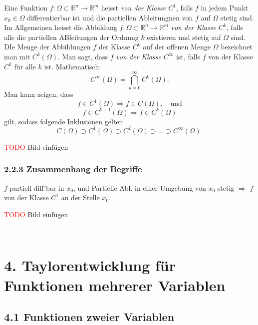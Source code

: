 \documentclass[a4paper,landscape,8pt]{extarticle}
\newcommand{\R}{\mathbb{R}}
\newcommand{\todo}{\textcolor{red}{TODO }}
\renewcommand*{\newpage}{ \ }
\begin{document}
\begin{multicols*}{4}
Eine Funktion $f\colon\Omega\subset\R^n\to\R^m$ heisst \emph{von der Klasse
$C^1$}, falls $f$ in jedem Punkt $x_0\in\Omega$ differentierbar ist und die
partiellen Ableitungnen von $f$ auf $\Omega$ stetig sind. Im Allgemeinen heisst
die Abbildung $f\colon\Omega\subset\R^n\to\R^m$ \emph{von der Klasse $C^k$},
falls alle die partiellen ABleitungen der Ordnung $k$ existieren und stetig auf
$\Omega$ sind. DIe Menge der Abbildungen $f$ der Klasse $C^k$ auf der offenen
Menge $\Omega$ bezeichnet man mit $C^k(\Omega)$. Man sagt, dass $f$ \emph{von
der Klasse $C^\infty$} ist, falls $f$ von der Klasse $C^k$ für alle $k$ ist.
Mathematisch:
\[
C^\infty(\Omega) = \bigcap_{k=0}^\infty C^k(\Omega).
\]
Man kann zeigen, dass
\[
f\in C^1(\Omega) \Longrightarrow f\in C(\Omega), \quad \text{und}
\]
\[
f\in
C^{k+1}(\Omega) \Longrightarrow f \in C^k(\Omega)
\]
gilt, sodass folgende Inklusionen gelten
\[
C(\Omega) \supset C^1(\Omega)  \supset C^2(\Omega) \supset \ldots \supset
C^\infty(\Omega).
\]

\begin{warmup}

\todo{Bild einfügen}

\subsubsection{2.2.3 Zusammenhang der Begriffe}

$f$ partiell diff'bar in $x_0$, und Partielle Abl. in einer Umgebung von $x_0$
stetig $\Rightarrow$ $f$ von der Klasse $C^1$ an der Stelle $x_0$.


\todo Bild einfügen
\end{warmup}







\newpage

\section{4. Taylorentwicklung für Funktionen mehrerer Variablen}

\subsection{4.1 Funktionen zweier Variablen}


\end{multicols*}
\end{document}
